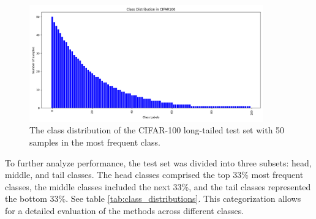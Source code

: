 
\begin{figure}[h!]
    \centering
    \includegraphics[width=0.9\textwidth]{Images/Plots/cifar100_test_imb.png}
    \caption{The class distribution of the CIFAR-100 long-tailed test set with 50 samples in the most frequent class.}
    \label{fig:cifar100_test_imb}
\end{figure}

To further analyze performance, the test set was divided into three subsets: head, middle, and tail classes. The head classes comprised the top 33\% most frequent classes, the middle classes included the next 33\%, and the tail classes represented the bottom 33\%. See table \ref{tab:class_distributions}. This categorization allows for a detailed evaluation of the methods across different classes. 







